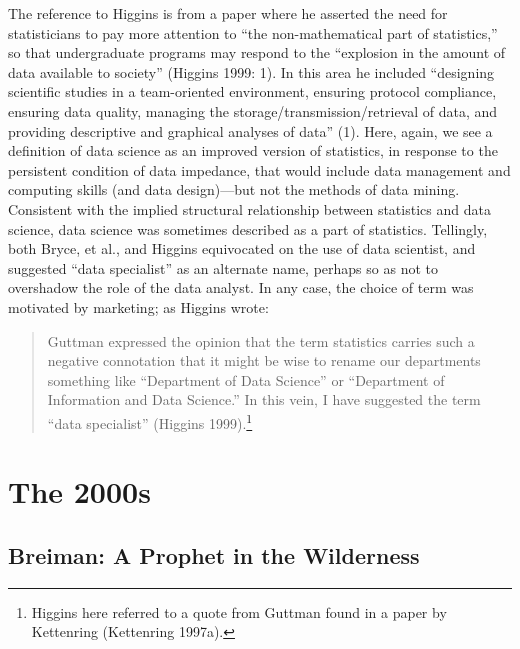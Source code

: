 \documentclass[
  letterpaper,
]{report}
\begin{document}
The reference to Higgins is from a paper where he asserted the need for
statisticians to pay more attention to ``the non-mathematical part of
statistics,'' so that undergraduate programs may respond to the
``explosion in the amount of data available to society'' (Higgins 1999:
1). In this area he included ``designing scientific studies in a
team-oriented environment, ensuring protocol compliance, ensuring data
quality, managing the storage/transmission/retrieval of data, and
providing descriptive and graphical analyses of data'' (1). Here, again,
we see a definition of data science as an improved version of
statistics, in response to the persistent condition of data impedance,
that would include data management and computing skills (and data
design)---but not the methods of data mining. Consistent with the
implied structural relationship between statistics and data science,
data science was sometimes described as a part of statistics. Tellingly,
both Bryce, et al., and Higgins equivocated on the use of data
scientist, and suggested ``data specialist'' as an alternate name,
perhaps so as not to overshadow the role of the data analyst. In any
case, the choice of term was motivated by marketing; as Higgins wrote:

\begin{quote}
Guttman expressed the opinion that the term statistics carries such a
negative connotation that it might be wise to rename our departments
something like ``Department of Data Science'' or ``Department of
Information and Data Science.'' In this vein, I have suggested the term
``data specialist'' (Higgins 1999).\footnote{Higgins here referred to a
  quote from Guttman found in a paper by Kettenring (Kettenring 1997a).}
\end{quote}

\hypertarget{the-2000s}{%
\chapter{The 2000s}\label{the-2000s}}

\hypertarget{breiman-a-prophet-in-the-wilderness}{%
\section{Breiman: A Prophet in the
Wilderness}\label{breiman-a-prophet-in-the-wilderness}}
\end{document}
